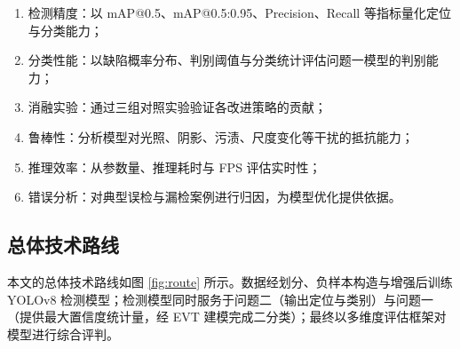 \begin{enumerate}[leftmargin=2.2em,itemsep=2pt]
  \item {\heiti 检测精度：}以 mAP@0.5、mAP@0.5:0.95、Precision、Recall 等指标量化定位与分类能力；
  \item {\heiti 分类性能：}以缺陷概率分布、判别阈值与分类统计评估问题一模型的判别能力；
  \item {\heiti 消融实验：}通过三组对照实验验证各改进策略的贡献；
  \item {\heiti 鲁棒性：}分析模型对光照、阴影、污渍、尺度变化等干扰的抵抗能力；
  \item {\heiti 推理效率：}从参数量、推理耗时与 FPS 评估实时性；
  \item {\heiti 错误分析：}对典型误检与漏检案例进行归因，为模型优化提供依据。
\end{enumerate}

\subsection{总体技术路线}

本文的总体技术路线如图 \ref{fig:route} 所示。数据经划分、负样本构造与增强后训练 YOLOv8 检测模型；检测模型同时服务于问题二（输出定位与类别）与问题一（提供最大置信度统计量，经 EVT 建模完成二分类）；最终以多维度评估框架对模型进行综合评判。

